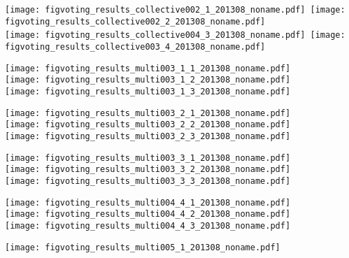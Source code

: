 \begin{frame}[plain]
\begin{frame}[plain]
\begin{frame}[plain]
\begin{frame}[plain]
\begin{frame}[plain]
\begin{frame}[plain]
  \texttt{[image: figvoting\_results\_collective002\_1\_201308\_noname.pdf]}~\texttt{[image: figvoting\_results\_collective002\_2\_201308\_noname.pdf]}\\
  \texttt{[image: figvoting\_results\_collective004\_3\_201308\_noname.pdf]}~\texttt{[image: figvoting\_results\_collective003\_4\_201308\_noname.pdf]}




  

  \texttt{[image: figvoting\_results\_multi003\_1\_1\_201308\_noname.pdf]}\\
  \texttt{[image: figvoting\_results\_multi003\_1\_2\_201308\_noname.pdf]}\\
  \texttt{[image: figvoting\_results\_multi003\_1\_3\_201308\_noname.pdf]}


  

  \texttt{[image: figvoting\_results\_multi003\_2\_1\_201308\_noname.pdf]}\\
  \texttt{[image: figvoting\_results\_multi003\_2\_2\_201308\_noname.pdf]}\\
  \texttt{[image: figvoting\_results\_multi003\_2\_3\_201308\_noname.pdf]}


  

  \texttt{[image: figvoting\_results\_multi003\_3\_1\_201308\_noname.pdf]}\\
  \texttt{[image: figvoting\_results\_multi003\_3\_2\_201308\_noname.pdf]}\\
  \texttt{[image: figvoting\_results\_multi003\_3\_3\_201308\_noname.pdf]}


  

  \texttt{[image: figvoting\_results\_multi004\_4\_1\_201308\_noname.pdf]}\\
  \texttt{[image: figvoting\_results\_multi004\_4\_2\_201308\_noname.pdf]}\\
  \texttt{[image: figvoting\_results\_multi004\_4\_3\_201308\_noname.pdf]}


\begin{frame}[plain]
  

  \texttt{[image: figvoting\_results\_multi005\_1\_201308\_noname.pdf]}



\end{frame}
\end{frame}
\end{frame}
\end{frame}
\end{frame}
\end{frame}
\end{frame}

